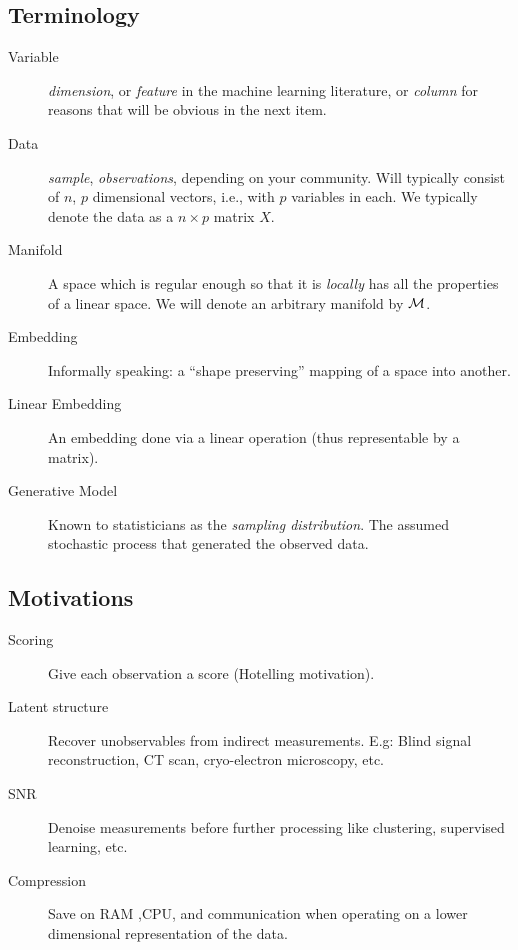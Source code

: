 \documentclass[12pt,a4paper]{article}
\begin{document}
\subsection{Terminology}

\begin{tcolorbox}
	\begin{description}
		
		\item[Variable] \Aka \emph{dimension}, or \emph{feature} in the machine learning literature, or \emph{column} for reasons that will be obvious in the next item. 
		
		\item[Data] \Aka \emph{sample}, \emph{observations}, depending on your community. 
		Will typically consist of $n$, $p$ dimensional vectors, i.e., with $p$ variables in each.
		We typically denote the data as a $n\times p$ matrix $X$. 
		
		\item[Manifold] A space which is regular enough so that it is \emph{locally} has all the properties of a linear space. 
		We will denote an arbitrary manifold by $\mathcal{M}$.
		
		
		\item[Embedding] Informally speaking: a ``shape preserving'' mapping of a space into another. 
		
		\item[Linear Embedding] An embedding done via a linear operation (thus representable by a matrix). 
		
		\item[Generative Model] Known to statisticians as the \emph{sampling distribution}. 
		The assumed stochastic process that generated the observed data. 
		
	\end{description}
\end{tcolorbox}




\subsection{Motivations}

\begin{description}
	\item [Scoring] Give each observation a score (Hotelling motivation).

	\item [Latent structure] Recover unobservables from indirect measurements. 
	E.g: Blind signal reconstruction, CT scan, cryo-electron microscopy, etc. 
	
	\item [SNR] Denoise measurements before further processing like clustering, supervised learning, etc. 
	
	\item [Compression] Save on RAM ,CPU, and communication when operating on a lower dimensional representation of the data. 
	
\end{description}
\end{document}
